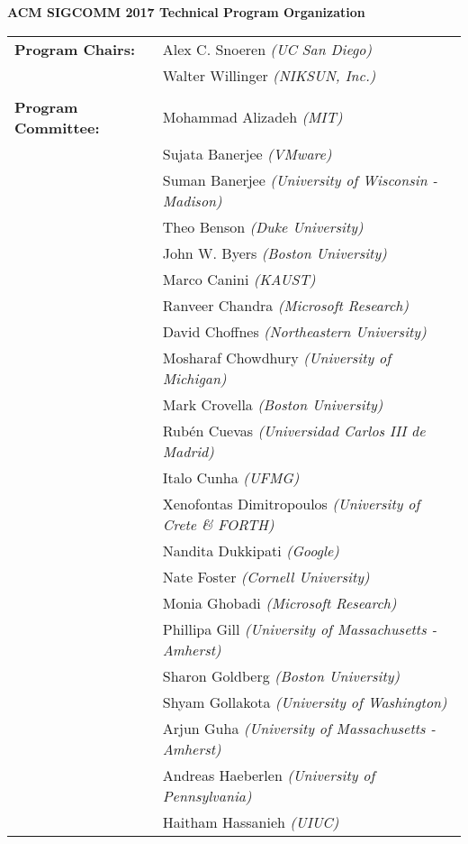 \documentclass[11pt]{article}
\begin{document}
\begin{center}
\Large\textbf{ACM SIGCOMM 2017 Technical Program Organization}
\end{center}

\vspace{0.2cm}

\begin{supertabular}{ll}
  \textbf{Program Chairs:}
  
 & Alex C. Snoeren \emph{(UC San Diego)} \\
 & Walter Willinger \emph{(NIKSUN, Inc.)} \\
 \\
\textbf{Program Committee:}
 & Mohammad Alizadeh \emph{(MIT)} \\
 & Sujata Banerjee \emph{(VMware)} \\
 & Suman Banerjee \emph{(University of Wisconsin - Madison)} \\
 & Theo Benson \emph{(Duke University)} \\
 & John W. Byers \emph{(Boston University)} \\
 & Marco Canini \emph{(KAUST)} \\
 & Ranveer Chandra \emph{(Microsoft Research)} \\
 & David Choffnes \emph{(Northeastern University)} \\
 & Mosharaf Chowdhury \emph{(University of Michigan)} \\
 & Mark Crovella \emph{(Boston University)} \\
 & Rubén Cuevas \emph{(Universidad Carlos III de Madrid)} \\
 & Italo Cunha \emph{(UFMG)} \\
 & Xenofontas Dimitropoulos \emph{(University of Crete \& FORTH)} \\
 & Nandita Dukkipati \emph{(Google)} \\
 & Nate Foster \emph{(Cornell University)} \\
 & Monia Ghobadi \emph{(Microsoft Research)} \\
 & Phillipa Gill \emph{(University of Massachusetts - Amherst)} \\
 & Sharon Goldberg \emph{(Boston University)} \\
 & Shyam Gollakota \emph{(University of Washington)} \\
 & Arjun Guha \emph{(University of Massachusetts - Amherst)} \\
 & Andreas Haeberlen \emph{(University of Pennsylvania)} \\
 & Haitham Hassanieh \emph{(UIUC)} \\

\end{supertabular}
\end{document}
